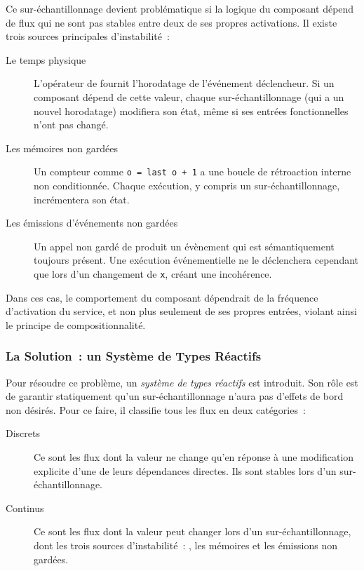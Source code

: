 Ce sur-échantillonnage devient problématique si la logique du composant dépend de flux qui ne sont
pas stables entre deux de ses propres activations. Il existe trois sources principales d'instabilité~:
\begin{description}
      \item[Le temps physique] L'opérateur \timeExpr de \GRFRP fournit l'horodatage de l'événement
            déclencheur. Si un composant dépend de cette valeur, chaque sur-échantillonnage (qui a
            un nouvel horodatage) modifiera son état, même si ses entrées fonctionnelles n'ont pas
            changé.
      \item[Les mémoires non gardées] Un compteur comme \texttt{o = last o + 1} a une boucle de
            rétroaction interne non conditionnée. Chaque exécution, y compris un
            sur-échantillonnage, incrémentera son état.
      \item[Les émissions d'événements non gardées] Un appel non gardé de 
            produit un évènement qui est sémantiquement toujours présent. Une exécution
            événementielle ne le déclenchera cependant que lors d'un changement de \texttt{x},
            créant une incohérence.
\end{description}
Dans ces cas, le comportement du composant dépendrait de la fréquence d'activation du service, et
non plus seulement de ses propres entrées, violant ainsi le principe de compositionnalité.

\subsubsection{La Solution~: un Système de Types Réactifs}

Pour résoudre ce problème, un \emph{système de types réactifs} est introduit. Son rôle est de
garantir statiquement qu'un sur-échantillonnage n'aura pas d'effets de bord non désirés. Pour ce
faire, il classifie tous les flux en deux catégories~:
\begin{description}
      \item [Discrets] Ce sont les flux dont la valeur ne change qu'en réponse à une modification
            explicite d'une de leurs dépendances directes. Ils sont stables lors d'un
            sur-échantillonnage.
      \item [Continus] Ce sont les flux dont la valeur peut changer lors d'un sur-échantillonnage,
            dont les trois sources d'instabilité~: , les mémoires  et les
            émissions  non gardées.
\end{description}

